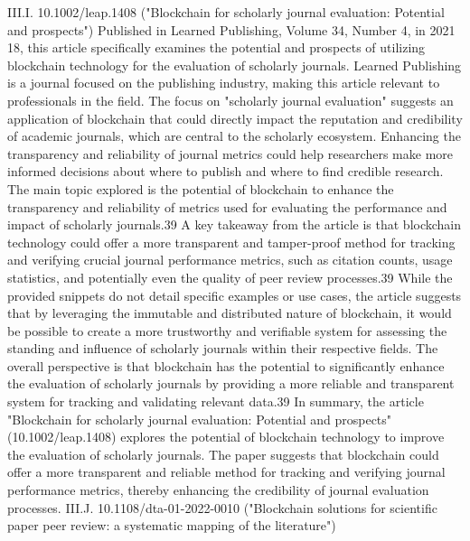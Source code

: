 \documentclass{article}
\begin{document}
III.I. 10.1002/leap.1408 ("Blockchain for scholarly journal evaluation: Potential and prospects")
Published in Learned Publishing, Volume 34, Number 4, in 2021 18, this article specifically examines the potential and prospects of utilizing blockchain technology for the evaluation of scholarly journals. Learned Publishing is a journal focused on the publishing industry, making this article relevant to professionals in the field. The focus on "scholarly journal evaluation" suggests an application of blockchain that could directly impact the reputation and credibility of academic journals, which are central to the scholarly ecosystem. Enhancing the transparency and reliability of journal metrics could help researchers make more informed decisions about where to publish and where to find credible research. The main topic explored is the potential of blockchain to enhance the transparency and reliability of metrics used for evaluating the performance and impact of scholarly journals.39 A key takeaway from the article is that blockchain technology could offer a more transparent and tamper-proof method for tracking and verifying crucial journal performance metrics, such as citation counts, usage statistics, and potentially even the quality of peer review processes.39 While the provided snippets do not detail specific examples or use cases, the article suggests that by leveraging the immutable and distributed nature of blockchain, it would be possible to create a more trustworthy and verifiable system for assessing the standing and influence of scholarly journals within their respective fields. The overall perspective is that blockchain has the potential to significantly enhance the evaluation of scholarly journals by providing a more reliable and transparent system for tracking and validating relevant data.39
In summary, the article "Blockchain for scholarly journal evaluation: Potential and prospects" (10.1002/leap.1408) explores the potential of blockchain technology to improve the evaluation of scholarly journals. The paper suggests that blockchain could offer a more transparent and reliable method for tracking and verifying journal performance metrics, thereby enhancing the credibility of journal evaluation processes.
III.J. 10.1108/dta-01-2022-0010 ("Blockchain solutions for scientific paper peer review: a systematic mapping of the literature")
\end{document}
